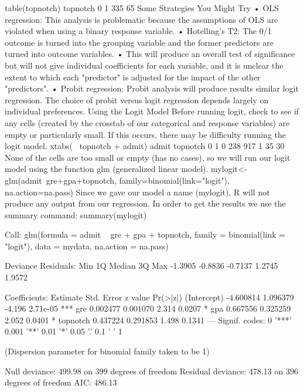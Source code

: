 table(topnotch)
topnotch
0 1 
335 65 
Some Strategies You Might Try
•	OLS regression:  This analysis is problematic because the assumptions of OLS are violated when using a binary response variable. 
•	Hotelling's T2:  The 0/1 outcome is turned into the grouping variable and the former predictors are turned into outcome variables. 
•	This will produce an overall test of significance but will not give individual coefficients for each variable, and it is unclear the extent to which each "predictor" is adjusted for the impact of the other "predictors". 
•	Probit regression:  Probit analysis will produce results similar logit regression. The choice of probit versus logit regression depends largely on individual preferences. 
Using the Logit Model
Before running logit, check to see if any cells (created by the crosstab of our categorical and response variables) are empty or particularly small.  If this occurs, there may be difficulty running the logit model.  
 xtabs(~ topnotch + admit)
        admit
topnotch   0   1
       0 238  917
       1  35  30
None of the cells are too small or empty (has no cases), so we will run our logit model using the function glm (generalized linear model).
mylogit<- glm(admit~gre+gpa+topnotch, family=binomial(link="logit"), na.action=na.pass)
Since we gave our model a name (mylogit), R will not produce any output from our regression. In order to get the results we use the summary command:
summary(mylogit)

Call:
glm(formula = admit ~ gre + gpa + topnotch, family = binomial(link = "logit"), 
    data = mydata, na.action = na.pass)

Deviance Residuals: 
    Min       1Q   Median       3Q      Max  
-1.3905  -0.8836  -0.7137   1.2745   1.9572  

Coefficients:
             Estimate Std. Error z value Pr(>|z|)    
(Intercept) -4.600814   1.096379  -4.196 2.71e-05 ***
gre          0.002477   0.001070   2.314   0.0207 *  
gpa          0.667556   0.325259   2.052   0.0401 *  
topnotch     0.437224   0.291853   1.498   0.1341    
---
Signif. codes:  0 '***' 0.001 '**' 0.01 '*' 0.05 '.' 0.1 ' ' 1 

(Dispersion parameter for binomial family taken to be 1)

Null deviance: 499.98  on 399  degrees of freedom
Residual deviance: 478.13  on 396  degrees of freedom
AIC: 486.13

